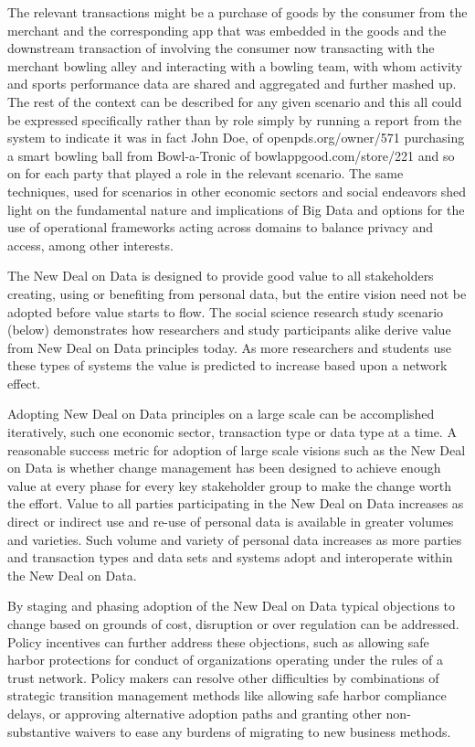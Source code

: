 The relevant transactions might be a purchase of goods by the consumer from the merchant and the corresponding app that was embedded in the goods and the downstream transaction of involving the consumer now transacting with the merchant bowling alley and interacting with a bowling team, with whom activity and sports performance data are shared and aggregated and further mashed up.
The rest of the context can be described for any given scenario and this all could be expressed specifically rather than by role simply by running a report from the system to indicate it was in fact John Doe, of openpds.org/owner/571 purchasing a smart bowling ball from Bowl-a-Tronic of bowlappgood.com/store/221 and so on for each party that played a role in the relevant scenario. 
The same techniques, used for scenarios in other economic sectors and social endeavors shed light on the fundamental nature and implications of Big Data and options for the use of operational frameworks acting across domains to balance privacy and access, among other interests.

The New Deal on Data is designed to provide good value to all stakeholders creating, using or benefiting from personal data, but the entire vision need not be adopted before value starts to flow. The social science research study scenario (below) demonstrates how researchers and study participants alike derive value from New Deal on Data principles today.  As more researchers and students use these types of systems the value is predicted to increase based upon a network effect.  

Adopting New Deal on Data principles on a large scale can be accomplished iteratively, such one economic sector, transaction type or data type at a time.  A reasonable success metric for adoption of large scale visions such as the New Deal on Data is whether change management has been designed to achieve enough value at every phase for every key stakeholder group to make the change worth the effort.  Value to all parties participating in the New Deal on Data increases as direct or indirect use and re-use of personal data is available in greater volumes and varieties.  Such volume and variety of personal data increases as more parties and transaction types and data sets and systems adopt and interoperate within the New Deal on Data.    

By staging and phasing adoption of the New Deal on Data typical objections to change based on grounds of cost, disruption or over regulation can be addressed.
Policy incentives can further address these objections, such as allowing safe harbor protections for conduct of organizations operating under the rules of a trust network.
Policy makers can resolve other difficulties by combinations of strategic transition management methods like allowing safe harbor compliance delays, or approving alternative adoption paths and granting other non-substantive waivers to ease any burdens of migrating to new business methods.  



